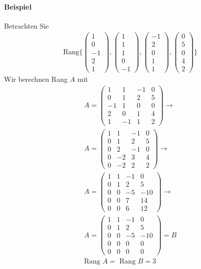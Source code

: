 \documentclass[11pt]{report}
\begin{document}
\paragraph{Beispiel}
Betrachten Sie 
\begin{align}
 \text{Rang}\{\begin{pmatrix} 1 \\ 0 \\ -1 \\ 2 \\ 1 \end{pmatrix}, \begin{pmatrix} 1 \\ 1 \\ 1 \\ 0 \\ -1 \end{pmatrix}, \begin{pmatrix} -1 \\ 2 \\ 0 \\ 1 \\ 1 \end{pmatrix}, \begin{pmatrix} 0 \\ 5 \\ 0 \\ 4 \\ 2 \end{pmatrix}\}
\end{align}
Wir berechnen Rang $A$ mit
\begin{align}
A = \begin{pmatrix} 1 & 1 & -1 & 0 \\ 0 & 1 & 2 & 5 \\ -1 & 1 & 0 & 0 \\ 2 & 0 & 1 & 4 \\ 1 & -1 & 1 & 2 \end{pmatrix} \rightarrow \\
A = \begin{pmatrix} 1 & 1 & -1 & 0 \\ 0 & 1 & 2 & 5 \\ 0 & 2 & -1 & 0 \\ 0 & -2 & 3 & 4 \\ 0 & -2 & 2 & 2 \end{pmatrix} \rightarrow \\
A = \begin{pmatrix} 1 & 1 & -1 & 0 \\ 0 & 1 & 2 & 5 \\ 0 & 0 & -5 & -10 \\ 0 & 0 & 7 & 14 \\ 0 & 0 & 6 & 12 \end{pmatrix} \rightarrow \\
A = \begin{pmatrix} 1 & 1 & -1 & 0 \\ 0 & 1 & 2 & 5 \\ 0 & 0 & -5 & -10 \\ 0 & 0 & 0 & 0 \\ 0 & 0 & 0 & 0 \end{pmatrix} = B \\
\text{Rang } A = \text{ Rang } B = 3
\end{align}
\end{document}
